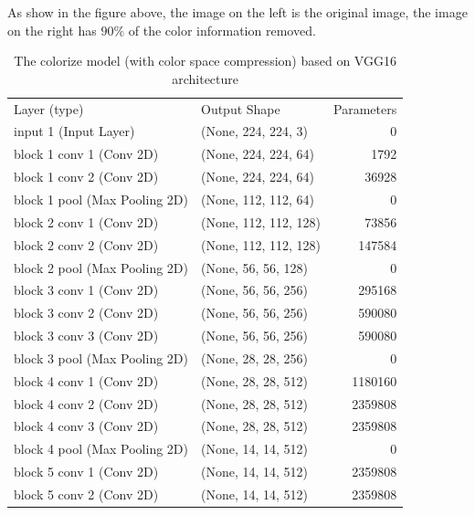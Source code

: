 \documentclass[12pt]{article}
\begin{document}
As show in the figure above, the image on the left is the original image, the image on the right has $90\%$ of the color information removed.


\begin{table}[H]
	\caption{The colorize model (with color space compression) based on VGG16 architecture}
  	\centering
	\begin{tabular}{|l|l|r|}
		\hline 
		Layer (type)                  &  Output Shape           &    Parameters  \\ \hhline{|=|=|=|}
		input 1 (Input Layer)         &  (None, 224, 224, 3)    &    0           \\ \hline
		block 1 conv 1 (Conv 2D)      &  (None, 224, 224, 64)   &    1792        \\ \hline 
		block 1 conv 2 (Conv 2D)      &  (None, 224, 224, 64)   &    36928       \\ \hline 
		block 1 pool (Max Pooling 2D) &  (None, 112, 112, 64)   &    0           \\ \hline 
		block 2 conv 1 (Conv 2D)      &  (None, 112, 112, 128)  &    73856       \\ \hline 
		block 2 conv 2 (Conv 2D)      &  (None, 112, 112, 128)  &    147584      \\ \hline 
		block 2 pool (Max Pooling 2D) &  (None, 56, 56, 128)    &    0           \\ \hline 
		block 3 conv 1 (Conv 2D)      &  (None, 56, 56, 256)    &    295168      \\ \hline 
		block 3 conv 2 (Conv 2D)      &  (None, 56, 56, 256)    &    590080      \\ \hline 
		block 3 conv 3 (Conv 2D)      &  (None, 56, 56, 256)    &    590080      \\ \hline 
		block 3 pool (Max Pooling 2D) &  (None, 28, 28, 256)    &    0           \\ \hline 
		block 4 conv 1 (Conv 2D)      &  (None, 28, 28, 512)    &    1180160     \\ \hline 
		block 4 conv 2 (Conv 2D)      &  (None, 28, 28, 512)    &    2359808     \\ \hline 
		block 4 conv 3 (Conv 2D)      &  (None, 28, 28, 512)    &    2359808     \\ \hline 
		block 4 pool (Max Pooling 2D) &  (None, 14, 14, 512)    &    0           \\ \hline 
		block 5 conv 1 (Conv 2D)      &  (None, 14, 14, 512)    &    2359808     \\ \hline 	
		block 5 conv 2 (Conv 2D)      &  (None, 14, 14, 512)    &    2359808     \\ \hline 

\end{tabular}
\end{table}
\end{document}
